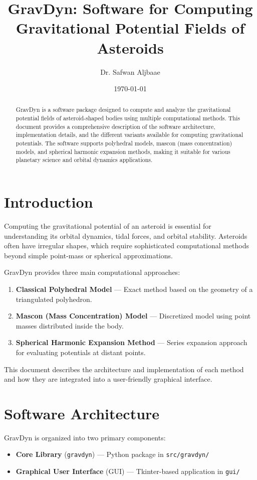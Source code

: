 \documentclass[a4paper,12pt]{article}
\title{GravDyn: Software for Computing Gravitational Potential Fields of Asteroids}
\author{Dr. Safwan Aljbaae}
\date{\today}
\begin{document}
\maketitle

\begin{abstract}
GravDyn is a software package designed to compute and analyze the gravitational potential fields of asteroid-shaped bodies using multiple computational methods. This document provides a comprehensive description of the software architecture, implementation details, and the different variants available for computing gravitational potentials. The software supports polyhedral models, mascon (mass concentration) models, and spherical harmonic expansion methods, making it suitable for various planetary science and orbital dynamics applications.
\end{abstract}

\section{Introduction}

Computing the gravitational potential of an asteroid is essential for understanding its orbital dynamics, tidal forces, and orbital stability. Asteroids often have irregular shapes, which require sophisticated computational methods beyond simple point-mass or spherical approximations.

GravDyn provides three main computational approaches:
\begin{enumerate}
    \item \textbf{Classical Polyhedral Model} — Exact method based on the geometry of a triangulated polyhedron.
    \item \textbf{Mascon (Mass Concentration) Model} — Discretized model using point masses distributed inside the body.
    \item \textbf{Spherical Harmonic Expansion Method} — Series expansion approach for evaluating potentials at distant points.
\end{enumerate}

This document describes the architecture and implementation of each method and how they are integrated into a user-friendly graphical interface.

\section{Software Architecture}

GravDyn is organized into two primary components:
\begin{itemize}
    \item \textbf{Core Library} (\texttt{gravdyn}) — Python package in \texttt{src/gravdyn/}
    \item \textbf{Graphical User Interface} (GUI) — Tkinter-based application in \texttt{gui/}
\end{itemize}
\end{document}
